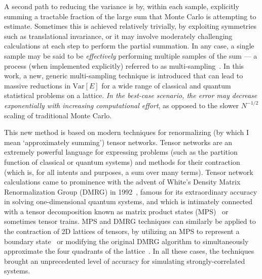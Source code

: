 \documentclass[aps,prl,nopacs,twocolumn]{revtex4}
\begin{document}
A second path to reducing the variance is by, within each sample, explicitly summing a tractable fraction of the large sum that Monte Carlo is attempting to estimate. Sometimes this is achieved relatively trivially, by exploiting symmetries such as translational invariance, or it may involve moderately challenging calculations at each step to perform the partial summation. In any case, a single sample may be said to be \emph{effectively} performing multiple samples of the sum --- a process (when implemented explicitly) referred to as multi-sampling~\cite{Sankowski2003}. In this work, a new, generic multi-sampling technique is introduced that can lead to massive reductions in $\mathrm{Var}[E]$ for a wide range of classical and quantum statistical problems on a lattice. \emph{In the best-case scenario, the error may decrease exponentially with increasing computational effort}, as opposed to the slower $N^{-1/2}$ scaling of traditional Monte Carlo.

This new method is based on modern techniques for renormalizing (by which I mean `approximately summing') tensor networks. Tensor networks are an extremely powerful language for expressing problems (such as the partition function of classical or quantum systems) and methods for their contraction (which is, for all intents and purposes, a sum over many terms). Tensor network calculations came to prominence with the advent of White's Density Matrix Renormalization Group (DMRG) in 1992~\cite{White1992}, famous for its extraordinary accuracy in solving one-dimensional quantum systems, and which is intimately connected with a tensor decomposition known as matrix product states (MPS)~\cite{Ostlund1995} or sometimes tensor trains. MPS and DMRG techniques can similarly be applied to the contraction of 2D lattices of tensors, by utilizing an MPS to represent a boundary state~\cite{Orus2008} or modifying the original DMRG algorithm to simultaneously approximate the four quadrants of the lattice~\cite{Nishino1997}. In all these cases, the techniques brought an unprecedented level of accuracy for simulating strongly-correlated systems.
\end{document}
